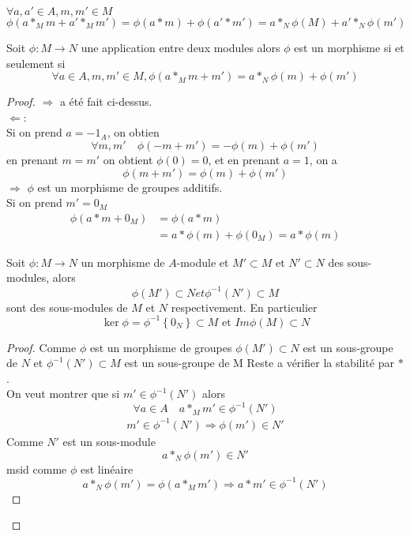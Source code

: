 \documentclass[../main.tex]{subfiles}
\begin{document}
\begin{rmq}
$\forall a, a' \in A, m,m' \in M$
\[ 
	\phi(a\ast_M m + a' \ast_M m') = \phi(a \ast m) + \phi(a' \ast m') = a \ast_N \phi(M) + a' \ast_N \phi(m')
\]

\end{rmq}
\begin{lemma}\label{lemma:critere_de_l_application_lineaire}
	Soit $\phi: M \to N$ une application entre deux modules alors  $\phi$ est un morphisme si et seulement si
	\[ 
	\forall a \in A, m, m' \in M, \phi(a \ast_M m + m') = a \ast_N \phi(m) + \phi(m')
	\]
	
\end{lemma}
\begin{proof}
$\Rightarrow$ a été fait ci-dessus.\\
$\Leftarrow$:\\
Si on prend $a=-1_A$, on obtien 
\[ 
	\forall m,m' \quad \phi(-m + m') = - \phi(m) + \phi(m')
\]
en prenant  $m=m'$ on obtient $\phi(0) = 0$, et en prenant $a=1$, on a 
\[ 
	\phi(m+m') = \phi(m) + \phi(m')
\]
$\Rightarrow$ $\phi$ est un morphisme de groupes additifs.\\
Si on prend $m'= 0_M$ 
\begin{align*}
	\phi(a \ast m +0_M) &= \phi(a \ast m)\\
			    &= a \ast \phi(m) + \phi(0_M) = a \ast \phi(m)
\end{align*}

\begin{propo}
Soit $\phi : M \to N$ un morphisme de $A $-module et $M' \subset M$ et $N' \subset N$ des sous-modules, alors
\[ 
	\phi(M') \subset N et \phi^{-1}(N') \subset M
\]
sont des sous-modules de $M$ et $N$ respectivement. En particulier
\[ 
	\ker \phi = \phi^{-1} \left\{ 0_N \right\} \subset M \text{ et } Im \phi(M) \subset N
\]
\end{propo}
\begin{proof}
	Comme $\phi$ est un morphisme de groupes $\phi(M') \subset N$ est un sous-groupe de $N$ et 
		$\phi^{-1}(N') \subset M$ est un sous-groupe de M
	Reste a vérifier la stabilité par $\ast$.\\
 
	On veut montrer que si $m' \in \phi^{-1}(N')$ alors 
	\[ 
		\forall a \in A \quad a \ast_M m' \in \phi^{-1}(N')
	\]
\begin{align*}
	m' \in \phi^{-1}(N') \Rightarrow \phi(m') \in N'
\end{align*}
Comme $N'$ est un sous-module 
\[ 
	a \ast_N \phi(m') \in N'
\]
msid comme $\phi$ est linéaire
\[ 
	a \ast_N \phi(m') = \phi(a \ast_M m') \Rightarrow a \ast m' \in \phi^{-1}(N')
\]


\end{proof}
\end{proof}
\end{document}
